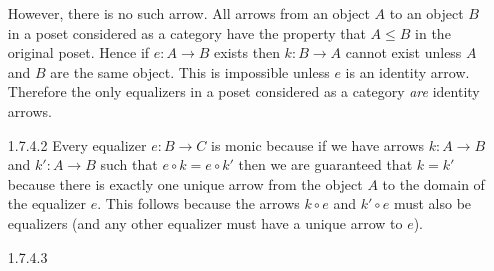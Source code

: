 \documentclass{article}
\begin{document}
\begin{enumerate}
\begin{center}
  \end{center}

  However, there is no such arrow.
  All arrows from an object $A$ to an object $B$ in a poset considered as a category have the property that $A \le B$ in the original poset.
  Hence if $e : A \rightarrow B$ exists then $k : B \rightarrow A$ cannot exist unless $A$ and $B$ are the same object.
  This is impossible unless $e$ is an identity arrow.
  Therefore the only equalizers in a poset considered as a category \emph{are} identity arrows.

\item[]
\item[1.7.4.2]
  Every equalizer $e : B \rightarrow C$ is monic because if we have arrows $k : A \rightarrow B$ and $k' : A \rightarrow B$ such that $e \circ k = e \circ k'$ then we are guaranteed that $k = k'$ because there is exactly one unique arrow from the object $A$ to the domain of the equalizer $e$.
  This follows because the arrows $k \circ e$ and $k' \circ e$ must also be equalizers (and any other equalizer must have a unique arrow to $e$).
  
\item[]
\item[1.7.4.3]
  
\end{enumerate}
\end{document}
